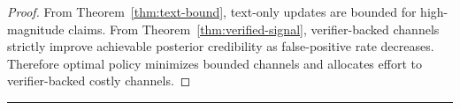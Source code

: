 \begin{proof}
From Theorem~\ref{thm:text-bound}, text-only updates are bounded for high-magnitude claims.
From Theorem~\ref{thm:verified-signal}, verifier-backed channels strictly improve achievable posterior credibility as false-positive rate decreases.
Therefore optimal policy minimizes bounded channels and allocates effort to verifier-backed costly channels.
\end{proof}

\begin{center}\rule{0.5\linewidth}{0.5pt}\end{center}
